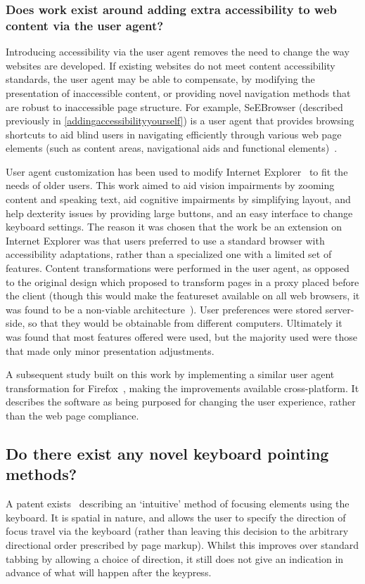 \documentclass[a4paper, 11pt]{article}
\begin{document}
\subsubsection{Does work exist around adding extra accessibility to web content via the user agent?}
Introducing accessibility via the user agent removes the need to change the way websites are developed. If existing websites do not meet content accessibility standards, the user agent may be able to compensate, by modifying the presentation of inaccessible content, or providing novel navigation methods that are robust to inaccessible page structure. For example, SeEBrowser (described previously in \cref{addingaccessibilityyourself}) is a user agent that provides browsing shortcuts to aid blind users in navigating efficiently through various web page elements (such as content areas, navigational aids and functional elements)~\cite{kouroupetroglou2007browsing}.

User agent customization has been used to modify Internet Explorer~\cite{hanson2005personalization} to fit the needs of older users. This work aimed to aid vision impairments by zooming content and speaking text, aid cognitive impairments by simplifying layout, and help dexterity issues by providing large buttons, and an easy interface to change keyboard settings. The reason it was chosen that the work be an extension on Internet Explorer was that users preferred to use a standard browser with accessibility adaptations, rather than a specialized one with a limited set of features. Content transformations were performed in the user agent, as opposed to the original design which proposed to transform pages in a proxy placed before the client (though this would make the featureset available on all web browsers, it was found to be a non-viable architecture~\cite{fairweather2002distributed,czaja2002designing,hanson2005achieving}). User preferences were stored server-side, so that they would be obtainable from different computers. Ultimately it was found that most features offered were used, but the majority used were those that made only minor presentation adjustments.

A subsequent study built on this work by implementing a similar user agent transformation for Firefox~\cite{hanson2005improving}, making the improvements available cross-platform. It describes the software as being purposed for changing the user experience, rather than the web page compliance.
\subsection{Do there exist any novel keyboard pointing methods?}
\label{novelpointing}
A patent exists~\cite{Mouyade:2011:EP2385452} describing an `intuitive' method of focusing elements using the keyboard. It is spatial in nature, and allows the user to specify the direction of focus travel via the keyboard (rather than leaving this decision to the arbitrary directional order prescribed by page markup). Whilst this improves over standard tabbing by allowing a choice of direction, it still does not give an indication in advance of what will happen after the keypress.
\end{document}
